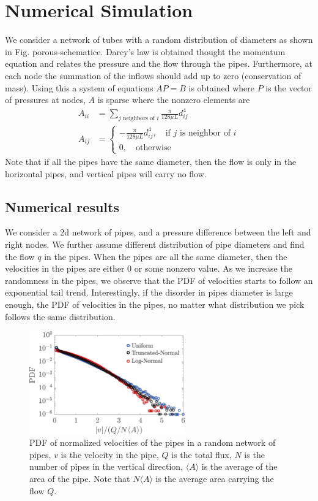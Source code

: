\section{Numerical Simulation}
%
We consider a network of tubes with a random distribution of diameters
as shown in Fig. {porous-schematic}e. Darcy's law is obtained thought
the momentum equation and relates the pressure and the flow through
the pipes. Furthermore, at each node the summation of the inflows
should add up to zero (conservation of mass). Using this a system of
equations $AP=B$ is obtained where $P$ is the vector of pressures at
nodes, $A$ is sparse where the nonzero elements are
% 
\begin{align}
  A_{ii} &= \sum_{j \text{ neighbors of } i} \frac{\pi }{128 \mu L} d_{ij}^4 \\
   A_{ij} &= 
  \begin{cases}
    -\frac{\pi }{128 \mu L} d_{ij}^4, \quad \text{if }j \text{ is
      neighbor of }i\\
    0, \quad \text{otherwise}
  \end{cases}
\end{align}
%
Note that if all the pipes have the same diameter, then the flow is
only in the horizontal pipes, and vertical pipes will carry no flow.


\subsection*{Numerical results}
%
We consider a 2d network of pipes, and a pressure difference between
the left and right nodes. We further assume different distribution of
pipe diameters and find the flow $q$ in the pipes. When the pipes are
all the same diameter, then the velocities in the pipes are either $0$
or some nonzero value. As we increase the randomness in the pipes, we
observe that the PDF of velocities starts to follow an exponential
tail trend. Interestingly, if the disorder in pipes diameter is large
enough, the PDF of velocities in the pipes, no matter what
distribution we pick follows the same distribution. 
%
\begin{figure}[h]
  \centering
  \includegraphics[width=0.6\textwidth]{./Figs/distribution}
  \caption{PDF of normalized velocities of the pipes in a random
    network of pipes, $v$ is the velocity in the pipe, $Q$ is the
    total flux, $N$ is the number of pipes in the vertical direction,
    $\langle A\rangle$ is the average of the area of the pipe. Note that
    $N\langle A\rangle$ is the average area carrying the flow $Q$. } \label{pdf-result}
\end{figure}


